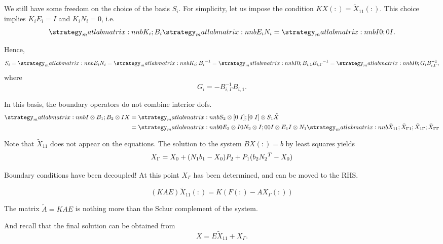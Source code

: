 \begin{frame}{We still have some freedom on the choice of the basis $S_i$.}
For simplicity, let us impose the condition $KX(:)=\tilde{X}_{11}(:)$. This choice implies $K_iE_i=I$ and $K_iN_i=0$, i.e.
\begin{equation*}
\matlabmatrix{K_i; B_i} \matlabmatrix{E_i N_i} = \matlabmatrix{I 0; 0 I}.
\end{equation*}

Hence,
\begin{equation*}
S_i = \matlabmatrix{E_i N_i} = \matlabmatrix{K_i; B_i}^{-1} = \matlabmatrix{I 0; B_{i,1} B_{i,\Gamma}}^{-1} = \matlabmatrix{I 0; G_i B_{i,\Gamma}^{-1}},
\end{equation*}
where
\begin{equation*}
G_i = -B_{i,\Gamma}^{-1}B_{i,1}.
\end{equation*}

\end{frame}


\begin{frame}{In this basis, the boundary operators do not combine interior dofs.}
\begin{align*}
\matlabmatrix{{I\kron B_1}; {B_2\kron I}} X &= \matlabmatrix{{S_2\kron\left[0~I\right]}; {\left[0~I\right]\kron S_1}} \tilde{X}\\
&=\matlabmatrix{{0} {E_2\kron I} {0} {N_2\kron I};
	{0} {0} {I\kron E_1}  {I\kron N_1}} \matlabmatrix{\tilde{X}_{11}; \tilde{X}_{\Gamma 1}; \tilde{X}_{1 \Gamma}; \tilde{X}_{\Gamma\Gamma}}
\end{align*}

Note that $\tilde{X}_{11}$ does not appear on the equations. The solution to the system $BX(:)=b$ by least squares yields
\begin{equation*}
X_\Gamma = X_0 + (N_1 b_1 - X_0)P_2 + P_1 (b_2 {N_2}^{T} - X_0 )
\end{equation*}

\end{frame}

\begin{frame}{Boundary conditions have been decoupled!}
At this point $X_\Gamma$ has been determined, and can be moved to the RHS.

\begin{equation*}
\left(KAE \right) \tilde{X}_{11}(:) = K\left(F(:)-AX_\Gamma(:)\right)
\end{equation*}

The matrix $\tilde{A}=KAE$ is nothing more than the Schur complement of the system.

\bigskip
And recall that the final solution can be obtained from
\begin{equation*}
X=E\tilde{X}_{11} + X_\Gamma.
\end{equation*}

\end{frame}
